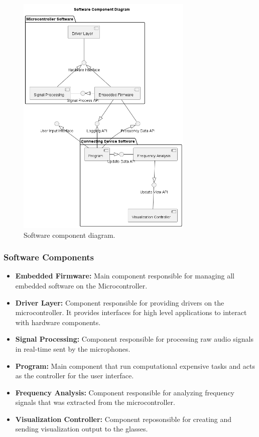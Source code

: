 \documentclass[12pt]{article}
\theoremstyle{definition}
\begin{document}
\begin{figure}[H]     
    \centering 
    \includegraphics[width=0.75\textwidth]{diagrams/s1_component_diagram.png}
    \caption{Software component diagram.}
    \label{fig:software_component_diagram}
\end{figure}

\subsubsection{Software Components}

\begin{itemize}
  \item \textbf{Embedded Firmware:} Main component responsible for managing all
  embedded software on the Microcontroller.

  \item \textbf{Driver Layer:} Component responsible for providing drivers on
  the microcontroller. It provides interfaces for high level applications to
  interact with hardware components.

  \item \textbf{Signal Processing:} Component responsible for processing raw
  audio signals in real-time sent by the microphones.
  
  \item \textbf{Program:} Main component that run computational expensive tasks
  and acts as the controller for the user interface.
  
  \item \textbf{Frequency Analysis:} Component responsible for analyzing
  frequency signals that was extracted from the microcontroller.
  
  \item \textbf{Visualization Controller:} Component reposonsible for
  creating and sending visualization output to the glasses.
\end{itemize}
\end{document}
